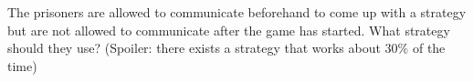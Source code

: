 \documentclass[]{article}
\newcommand{\taylor}[1]{{\color{blue} \sf $\spadesuit\spadesuit\spadesuit$ Taylor: [#1]}}
\numberwithin{equation}{section}
\theoremstyle{definition}
\theoremstyle{remark}
\begin{document}
The prisoners are allowed to communicate beforehand to come up with a strategy but are not allowed to communicate after the game has started. What strategy should they use? (Spoiler: there exists a strategy that works about 30\% of the time)

%
%
\end{document}
